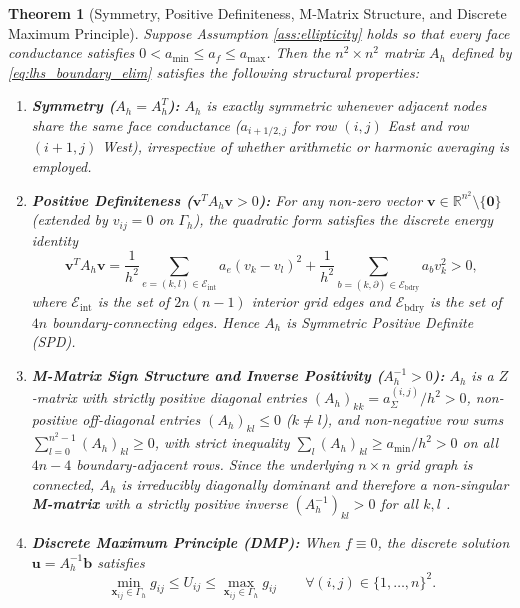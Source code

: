 \documentclass[11pt,a4paper]{article}
\newtheorem{theorem}{Theorem}[section]
\theoremstyle{definition}
\theoremstyle{remark}
\begin{document}
\begin{theorem}[Symmetry, Positive Definiteness, M-Matrix Structure, and Discrete Maximum Principle]
\label{thm:spd_mmatrix}
Suppose Assumption \ref{ass:ellipticity} holds so that every face conductance satisfies $0 < a_{\min} \le a_f \le a_{\max}$. Then the $n^2 \times n^2$ matrix $A_h$ defined by \eqref{eq:lhs_boundary_elim} satisfies the following structural properties:
\begin{enumerate}[label=(\roman*), leftmargin=2em, itemsep=2pt]
    \item \textbf{Symmetry ($A_h = A_h^T$):} $A_h$ is exactly symmetric whenever adjacent nodes share the same face conductance ($a_{i+1/2,j}$ for row $(i,j)$ East and row $(i+1,j)$ West), irrespective of whether arithmetic or harmonic averaging is employed.
    \item \textbf{Positive Definiteness ($\bm{v}^T A_h \bm{v} > 0$):} For any non-zero vector $\bm{v} \in \mathbb{R}^{n^2} \setminus \{\bm{0}\}$ (extended by $v_{ij} = 0$ on $\Gamma_h$), the quadratic form satisfies the discrete energy identity
    \begin{equation}
        \bm{v}^T A_h \bm{v} = \frac{1}{h^2}\sum_{e=(k,l) \in \mathcal{E}_{\text{int}}} a_e (v_k - v_l)^2 + \frac{1}{h^2}\sum_{b=(k,\partial) \in \mathcal{E}_{\text{bdry}}} a_b v_k^2 > 0,
        \label{eq:discrete_quadratic_form}
    \end{equation}
    where $\mathcal{E}_{\text{int}}$ is the set of $2n(n-1)$ interior grid edges and $\mathcal{E}_{\text{bdry}}$ is the set of $4n$ boundary-connecting edges. Hence $A_h$ is Symmetric Positive Definite (SPD).
    \item \textbf{M-Matrix Sign Structure and Inverse Positivity ($A_h^{-1} > 0$):} $A_h$ is a $Z$-matrix with strictly positive diagonal entries $(A_h)_{kk} = a_\Sigma^{(i,j)}/h^2 > 0$, non-positive off-diagonal entries $(A_h)_{kl} \le 0$ ($k \ne l$), and non-negative row sums $\sum_{l=0}^{n^2-1} (A_h)_{kl} \ge 0$, with strict inequality $\sum_l (A_h)_{kl} \ge a_{\min}/h^2 > 0$ on all $4n - 4$ boundary-adjacent rows. Since the underlying $n \times n$ grid graph is connected, $A_h$ is irreducibly diagonally dominant and therefore a non-singular \textbf{M-matrix} with a strictly positive inverse $(A_h^{-1})_{kl} > 0$ for all $k,l$ \cite{hackbusch2017}.
    \item \textbf{Discrete Maximum Principle (DMP):} When $f \equiv 0$, the discrete solution $\bm{u} = A_h^{-1}\bm{b}$ satisfies
    \begin{equation}
        \min_{\bm{x}_{ij} \in \Gamma_h} g_{ij} \le U_{ij} \le \max_{\bm{x}_{ij} \in \Gamma_h} g_{ij} \qquad \forall (i,j) \in \{1,\dots,n\}^2.
        \label{eq:dmp}
    \end{equation}
\end{enumerate}
\end{theorem}
\end{document}
